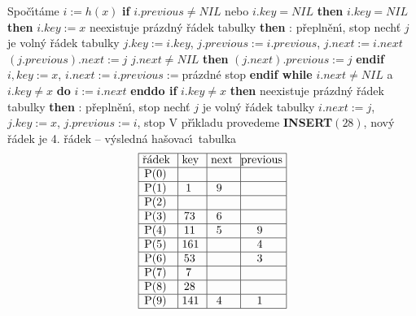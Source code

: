 Spo\v c\'\i t\'ame $i:=h\left(x\right)$\newline 
{\bf if} $i.previous\ne NIL$ nebo $i.key= NIL$ {\bf then}\newline
\phantom{---}{\bf if} $i.key=NIL$ {\bf then}\newline 
\phantom{------}$i.key:=x$\newline 
\phantom{---}{\bf else}\newline 
\phantom{------}{\bf if} neexistuje pr\'azdn\'y \v r\'adek tabulky {\bf then}\newline 
\phantom{---------}{\bf V\'ystup}: p\v repln\v en\'\i , stop\newline 
\phantom{------}{\bf else}\newline 
\phantom{---------}nech\v t $j$ je voln\'y \v r\'adek tabulky\newline 
\phantom{---------}$j.key:=i.key$, $j.previous:=i.previous$, $j.next
:=i.next$\newline 
\phantom{---------}$\left(j.previous\right).next:=j$\newline 
\phantom{---------}{\bf if} $j.next\ne NIL$ {\bf then} $\left(j.next\right).previous:=j$ {\bf endif}\newline 
\phantom{---------}$i,key:=x$, $i.next:=i.previous:=$pr\'azdn\'e\newline 
\phantom{------}{\bf endif}\newline 
\phantom{---}{\bf endif}\newline
\phantom{---}stop\newline
{\bf endif\newline
while} $i.next\ne NIL$ a $i.key\ne x$ {\bf do} $i:=i.next$ {\bf enddo\newline 
if} $i.key\ne x$ {\bf then}\newline 
\phantom{---}{\bf if} neexistuje pr\'azdn\'y \v r\'adek tabulky {\bf then}\newline 
\phantom{------}{\bf V\'ystup}: p\v repln\v en\'\i , stop\newline 
\phantom{---}{\bf else}\newline 
\phantom{------}nech\v t $j$ je voln\'y \v r\'adek tabulky\newline 
\phantom{------}$i.next:=j$, $j.key:=x$, $j.previous:=i$, stop\newline 
\phantom{---}{\bf endif\newline 
endif\newline 
endif}
\smallskip
\flushpar V p\v r\'\i kladu provedeme {\bf INSERT$\left(28\right)$}, nov\'y \v r\'adek je 4. \v r\'adek\newline 
-- v\'ysledn\'a ha\v sovac\'\i\ tabulka
$$\vtop{\offinterlineskip\halign {\strut\vrule\ # & \vrule\ # & \vrule\ # & \vrule \hfil # \hfil \vrule\cr\noalign{\hrule}\v r\'adek & key & next & previous\hfil \cr\noalign{\hrule}P(0) & & &\hfill \cr\noalign{\hrule}P(1) & 1 & 9 &\hfill \cr\noalign{\hrule}P(2) & & &\hfill \cr\noalign{\hrule}P(3) & 73 & 6 &\hfill \cr\noalign{\hrule}P(4) & 11 & 5 & 9 \cr\noalign{\hrule}P(5) & 161 & & 4 \cr\noalign{\hrule}P(6) & 53 & & 3 \cr\noalign{\hrule}P(7) & 7 & &\hfill \cr\noalign{\hrule}P(8) & 28 &  &\hfill  \cr\noalign{\hrule}P(9) & 141 & 4 & 1 \cr\noalign{\hrule}}}$$

